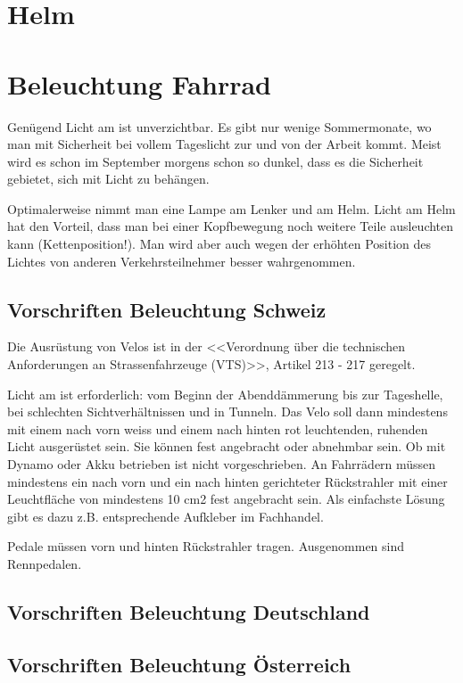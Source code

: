 \section{Helm}

\section{Beleuchtung Fahrrad}

Genügend Licht am \rv ist unverzichtbar.
Es gibt nur wenige Sommermonate, wo man mit Sicherheit bei vollem Tageslicht zur und von der Arbeit kommt.
Meist wird es schon im September morgens schon so dunkel, dass es die Sicherheit gebietet, sich mit Licht zu behängen.

Optimalerweise nimmt man eine Lampe am Lenker und am Helm. Licht am Helm hat den Vorteil, dass man bei einer Kopfbewegung
noch weitere Teile ausleuchten kann (Kettenposition!).
Man wird aber auch wegen der erhöhten Position des Lichtes von anderen Verkehrsteilnehmer besser wahrgenommen.

\subsection{Vorschriften Beleuchtung Schweiz}

Die Ausrüstung von Velos ist in der <<Verordnung über die technischen Anforderungen an Strassenfahrzeuge (VTS)>>,
Artikel 213 - 217 geregelt.

Licht am \rv ist erforderlich: vom Beginn der Abenddämmerung bis zur Tageshelle,
bei schlechten Sichtverhältnissen und in Tunneln.
Das Velo soll dann mindestens mit einem nach vorn weiss und einem nach hinten rot leuchtenden, ruhenden Licht ausgerüstet sein.
Sie können fest angebracht oder abnehmbar sein. Ob mit Dynamo oder Akku betrieben ist nicht vorgeschrieben.
An Fahrrädern müssen mindestens ein nach vorn und ein nach hinten gerichteter Rückstrahler
mit einer Leuchtfläche von mindestens 10 cm2 fest angebracht sein.
Als einfachste Lösung gibt es dazu z.B. entsprechende Aufkleber im Fachhandel.

Pedale müssen vorn und hinten Rückstrahler tragen. Ausgenommen sind Rennpedalen.

\subsection{Vorschriften Beleuchtung Deutschland}

\subsection{Vorschriften Beleuchtung Österreich}


